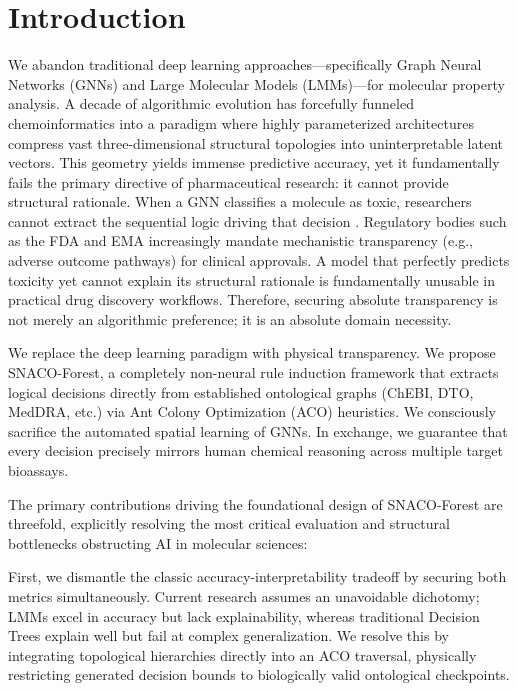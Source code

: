 \documentclass[preprint,12pt,authoryear]{elsarticle}
\begin{document}
\section{Introduction}
\label{sec:intro}

We abandon traditional deep learning approaches—specifically Graph Neural Networks (GNNs) and Large Molecular Models (LMMs)—for molecular property analysis. A decade of algorithmic evolution has forcefully funneled chemoinformatics into a paradigm where highly parameterized architectures compress vast three-dimensional structural topologies into uninterpretable latent vectors. This geometry yields immense predictive accuracy, yet it fundamentally fails the primary directive of pharmaceutical research: it cannot provide structural rationale. When a GNN classifies a molecule as toxic, researchers cannot extract the sequential logic driving that decision \citep{wang2022molclr}. Regulatory bodies such as the FDA and EMA increasingly mandate mechanistic transparency (e.g., adverse outcome pathways) for clinical approvals. A model that perfectly predicts toxicity yet cannot explain its structural rationale is fundamentally unusable in practical drug discovery workflows. Therefore, securing absolute transparency is not merely an algorithmic preference; it is an absolute domain necessity.

We replace the deep learning paradigm with physical transparency. We propose SNACO-Forest, a completely non-neural rule induction framework that extracts logical decisions directly from established ontological graphs (ChEBI, DTO, MedDRA, etc.) via Ant Colony Optimization (ACO) heuristics. We consciously sacrifice the automated spatial learning of GNNs. In exchange, we guarantee that every decision precisely mirrors human chemical reasoning across multiple target bioassays.

The primary contributions driving the foundational design of SNACO-Forest are threefold, explicitly resolving the most critical evaluation and structural bottlenecks obstructing AI in molecular sciences:

First, we dismantle the classic accuracy-interpretability tradeoff by securing both metrics simultaneously. Current research assumes an unavoidable dichotomy; LMMs excel in accuracy but lack explainability, whereas traditional Decision Trees explain well but fail at complex generalization. We resolve this by integrating topological hierarchies directly into an ACO traversal, physically restricting generated decision bounds to biologically valid ontological checkpoints.
\end{document}
